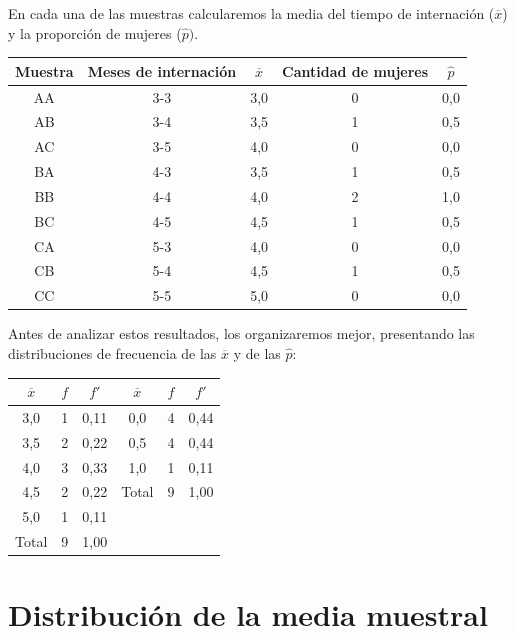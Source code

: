 \documentclass[]{book}
\begin{document}
En cada una de las muestras calcularemos la media del tiempo de
internación (\(\overline{x}\)) y la proporción de mujeres (\(\widehat{p})\).

\begin{table}[H]
\centering
\begin{tabular}{ccccc}
\toprule
Muestra & Meses de internación & $\overline{x}$ & Cantidad de mujeres & $\widehat{p}$\\
\midrule
\rowcolor{gray!6}  AA & 3-3 & 3,0 & 0 & 0,0\\
AB & 3-4 & 3,5 & 1 & 0,5\\
\rowcolor{gray!6}  AC & 3-5 & 4,0 & 0 & 0,0\\
BA & 4-3 & 3,5 & 1 & 0,5\\
\rowcolor{gray!6}  BB & 4-4 & 4,0 & 2 & 1,0\\
\addlinespace
BC & 4-5 & 4,5 & 1 & 0,5\\
\rowcolor{gray!6}  CA & 5-3 & 4,0 & 0 & 0,0\\
CB & 5-4 & 4,5 & 1 & 0,5\\
\rowcolor{gray!6}  CC & 5-5 & 5,0 & 0 & 0,0\\
\bottomrule
\end{tabular}
\end{table}

Antes de analizar estos resultados, los organizaremos mejor, presentando las distribuciones de frecuencia de las \(\overline{x}\) y de las \(\widehat{p}\):

\begin{table}[H]
\centering
\begin{tabular}{cccccc}
\toprule
$\overline{x}$ & $f$ & $f'$ & $\overline{x}$ & $f$ & $f'$\\
\midrule
\rowcolor{gray!6}  3,0 & 1 & 0,11 & 0,0 & 4 & 0,44\\
3,5 & 2 & 0,22 & 0,5 & 4 & 0,44\\
\rowcolor{gray!6}  4,0 & 3 & 0,33 & 1,0 & 1 & 0,11\\
4,5 & 2 & 0,22 & Total & 9 & 1,00\\
\rowcolor{gray!6}  5,0 & 1 & 0,11 &  &  & \\
\addlinespace
Total & 9 & 1,00 &  &  & \\
\bottomrule
\end{tabular}
\end{table}

\hypertarget{distribuciuxf3n-de-la-media-muestral}{%
\section{Distribución de la media muestral}\label{distribuciuxf3n-de-la-media-muestral}}
\end{document}
